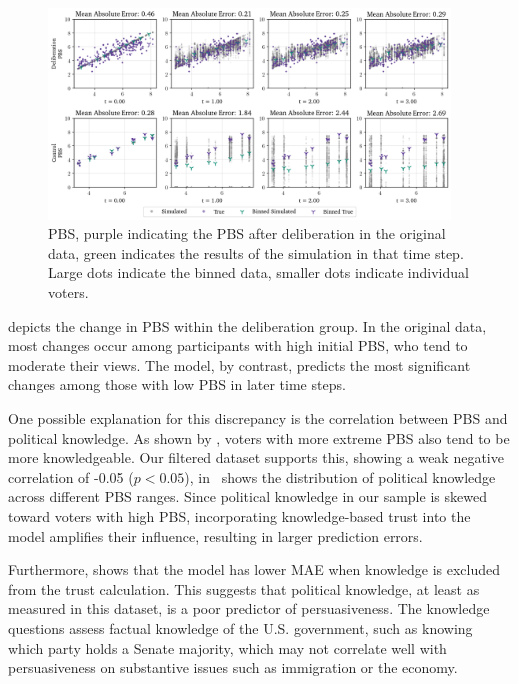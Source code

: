 \documentclass[11pt, oneside, dvipsnames]{Thesis} %
\begin{document}
\begin{figure}[ht]
	\begin{center}
		\includegraphics[width=0.95\textwidth]{Figures/pbs_scores.png}
	\end{center}
	\caption{ PBS, purple indicating the PBS after deliberation in the original data, green indicates the results of the simulation in that time step. Large dots indicate the binned data, smaller dots indicate individual voters.}\label{fig:pbs}
\end{figure}

 depicts the change in PBS within the deliberation
group. In the original data, most changes occur among participants
with high initial PBS, who tend to moderate their views. The model, by
contrast, predicts the most significant changes among those with low PBS in
later time steps.

One possible explanation for this discrepancy is the correlation between PBS
and political knowledge. As shown by
\citet{fishkinCanDeliberationHave2024}, voters with more extreme PBS also tend
to be more knowledgeable. Our filtered dataset supports this, showing a weak
negative correlation of -0.05 ($p < 0.05$), 
in~ shows the distribution of political knowledge across
different PBS ranges. Since political knowledge in our sample is skewed toward
voters with high PBS, incorporating knowledge-based trust into the model
amplifies their influence, resulting in larger prediction errors.

Furthermore,  shows that the model has lower MAE when
knowledge is excluded from the trust calculation. This suggests that political
knowledge, at least as measured in this dataset, is a poor predictor of
persuasiveness. The knowledge questions assess factual
knowledge of the U.S. government, such as knowing which party holds a
Senate majority, which may not correlate well with persuasiveness on substantive
issues such as immigration or the economy.
\end{document}
